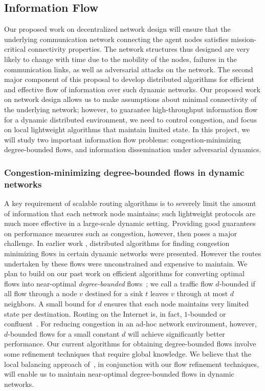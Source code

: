 \subsection{Information Flow}
Our proposed work on decentralized network design will ensure that the
underlying communication network connecting the agent nodes satisfies
mission-critical connectivity properties.  The network structures thus
designed are very likely to change with time due to the mobility of
the nodes, failures in the communication links, as well as adversarial
attacks on the network.  The second major component of this proposal
to develop distributed algorithms for efficient and effective flow of
information over such dynamic networks.  Our proposed work on network
design allows us to make assumptions about minimal connectivity of the
underlying network; however, to guarantee high-throughput information
flow for a dynamic distributed environment, we need to control
congestion, and focus on local lightweight algorithms that maintain
limited state.  In this project, we will study two important
information flow problems: congestion-minimizing degree-bounded flows,
and information dissemination under adversarial dynamics.

\subsubsection{Congestion-minimizing degree-bounded flows in dynamic
  networks} A key requirement of scalable routing algorithms is to
severely limit the amount of information that each network node
maintains; such lightweight protocols are much more effective in a
large-scale dynamic setting.  Providing good guarantees on performance
measures such as congestion, however, then poses a major challenge.
In earlier work \cite{awerbuch+l:flow}, distributed algorithms for
finding congestion minimizing flows in certain dynamic networks were
presented.  However the routes undertaken by these flows were
unconstrained and expensive to maintain.  We plan to build on our past
work on efficient algorithms for converting optimal flows into
near-optimal {\em degree-bounded}
flows~\cite{chen+klrsv:flow,chen+mrs:flow}; we call a traffic flow
$d$-bounded if all flow through a node $v$ destined for a sink $t$
leaves $v$ through at most $d$ neighbors.  A small bound for $d$
ensures that each node maintains very limited state per destination.
Routing on the Internet is, in fact, $1$-bounded or
confluent~\cite{chen+mrs:flow}.  For reducing congestion in an ad-hoc
network environment, however, $d$-bounded flows for a small constant
$d$ will achieve significantly better performance.  Our current
algorithms for obtaining degree-bounded flows involve some refinement
techniques that require global knowledge.  We believe that the local
balancing approach of~\cite{awerbuch+l:flow}, in conjunction with our
flow refinement techniques, will enable us to maintain near-optimal
degree-bounded flows in dynamic networks.

